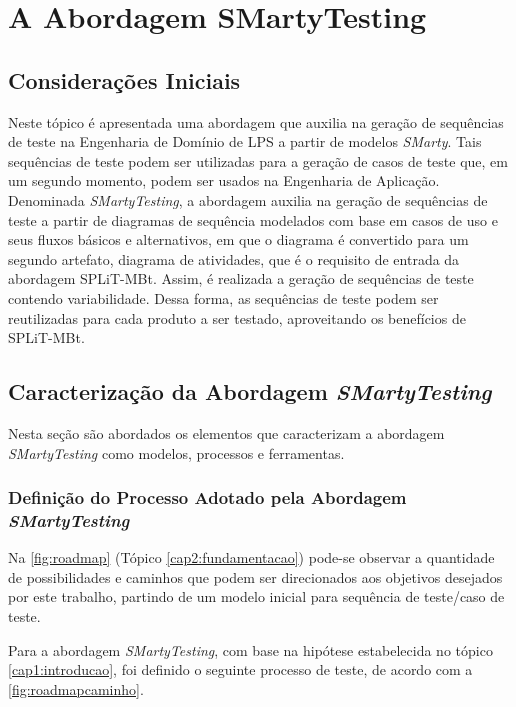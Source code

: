\chapter{A Abordagem SMartyTesting}
\label{cap3:abordagemsmartytesting}
\pagestyle{plain}

\section{Considerações Iniciais}

Neste tópico é apresentada uma abordagem que auxilia na geração de sequências de teste na Engenharia de Domínio de LPS a partir de modelos \textit{SMarty}. Tais sequências de teste podem ser utilizadas para a geração de casos de teste que, em um segundo momento, podem ser usados na Engenharia de Aplicação. Denominada \textit{SMartyTesting}, a abordagem auxilia na geração de sequências de teste a partir de diagramas de sequência modelados com base em casos de uso e seus fluxos básicos e alternativos, em que o diagrama é convertido para um segundo artefato, diagrama de atividades, que é o requisito de entrada da abordagem SPLiT-MBt. Assim, é realizada a geração de sequências de teste contendo variabilidade. Dessa forma, as sequências de teste podem ser reutilizadas para cada produto a ser testado, aproveitando os benefícios de SPLiT-MBt.

\section{Caracterização da Abordagem \textit{SMartyTesting}}
\label{cap3sec:caracterizacao_smarty}

Nesta seção são abordados os elementos que caracterizam a abordagem \textit{SMartyTesting} como modelos, processos e ferramentas.

\subsection{Definição do Processo Adotado pela Abordagem \textit{SMartyTesting}}
\label{cap3subsec:definicaoabordagem}

Na \ref{fig:roadmap} (Tópico \ref{cap2:fundamentacao}) pode-se observar a quantidade de possibilidades e caminhos que podem ser direcionados aos objetivos desejados por este trabalho, partindo de um modelo inicial para sequência de teste/caso de teste.

Para a abordagem \textit{SMartyTesting}, com base na hipótese estabelecida no tópico \ref{cap1:introducao}, foi definido o seguinte processo de teste, de acordo com a \ref{fig:roadmapcaminho}.

